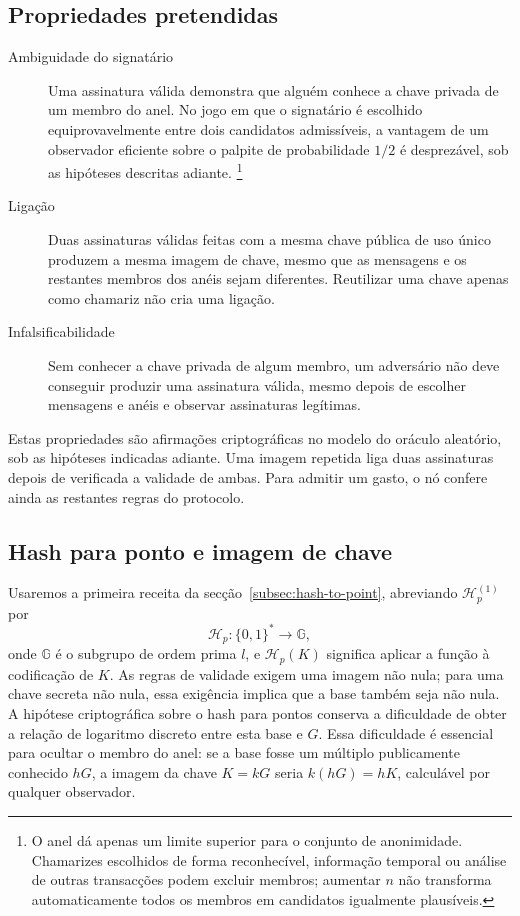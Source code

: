 \subsection*{Propriedades pretendidas}

\begin{description}
    \item[Ambiguidade do signatário] Uma assinatura válida demonstra que
    alguém conhece a chave privada de um membro do anel. No jogo em que o
    signatário é escolhido equiprovavelmente entre dois candidatos admissíveis,
    a vantagem de um observador eficiente sobre o palpite de probabilidade
    \(1/2\) é desprezável, sob as hipóteses descritas adiante.
    \footnote{\label{anonymity_note}O anel dá apenas um limite superior para o
    conjunto de anonimidade. Chamarizes escolhidos de forma reconhecível,
    informação temporal ou análise de outras transacções podem excluir
    membros; aumentar \(n\) não transforma automaticamente todos os membros
    em candidatos igualmente plausíveis.}

    \item[Ligação] Duas assinaturas válidas feitas com a mesma chave pública
    de uso único produzem a mesma imagem de chave, mesmo que as mensagens e os
    restantes membros dos anéis sejam diferentes. Reutilizar uma chave apenas
    como chamariz não cria uma ligação.

    \item[Infalsificabilidade] Sem conhecer a chave privada de algum membro,
    um adversário não deve conseguir produzir uma assinatura válida, mesmo
    depois de escolher mensagens e anéis e observar assinaturas legítimas.
\end{description}

Estas propriedades são afirmações criptográficas no modelo do oráculo
aleatório, sob as hipóteses indicadas adiante. Uma imagem repetida liga duas
assinaturas depois de verificada a validade de ambas. Para admitir um gasto,
o nó confere ainda as restantes regras do protocolo.

\subsection*{Hash para ponto e imagem de chave}

Usaremos a primeira receita da secção~\ref{subsec:hash-to-point},
abreviando \(\mathcal H_p^{(1)}\) por
\[
\mathcal H_p:\{0,1\}^*\longrightarrow\mathbb G,
\]
onde \(\mathbb G\) é o subgrupo de ordem prima \(l\), e
\(\mathcal H_p(K)\) significa aplicar a função à codificação de \(K\).
As regras de validade exigem uma imagem não nula; para uma chave secreta
não nula, essa exigência implica que a base também seja não nula.
A hipótese criptográfica sobre o hash para pontos conserva a dificuldade
de obter a relação de logaritmo discreto entre esta base e \(G\).
Essa dificuldade é essencial para ocultar o membro do anel: se a base
fosse um múltiplo publicamente conhecido \(hG\), a imagem da chave
\(K=kG\) seria \(k(hG)=hK\), calculável por qualquer observador.

